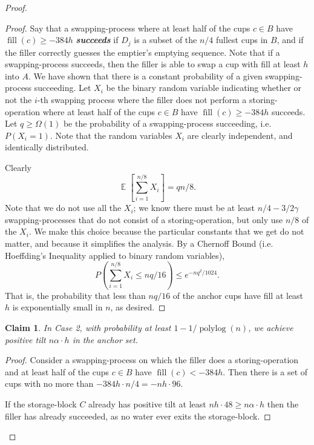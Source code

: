 \documentclass[twocolumn]{article}[10pt]
\newcommand{\defn}[1]{{\textit{\textbf{\boldmath #1}}}\xspace}
\DeclareMathOperator{\E}{\mathbb{E}}
\DeclareMathOperator{\polylog}{\text{polylog}}
\DeclareMathOperator{\fil}{\text{fill}}
\newtheorem{clm}{Claim}
\begin{document}
\begin{proof}
\begin{proof}
  Say that a swapping-process where at least half of the cups $c\in B$ have
  $\fil(c) \ge -384h$ \defn{succeeds} if $D_j$ is a subset of the $n/4$ fullest
  cups in $B$, and if the filler correctly guesses the emptier's emptying
  sequence. Note that if a swapping-process succeeds, then the filler is able
  to swap a cup with fill at least $h$ into $A$. We have shown that there is a
  constant probability of a given swapping-process succeeding. Let $X_i$ be the
  binary random variable indicating whether or not the $i$-th swapping process
  where the filler does not perform a storing-operation where at least half of
  the cups $c\in B$ have $\fil(c) \ge -384h$ succeeds. Let $q \ge \Omega(1)$ be
  the probability of a swapping-process succeeding, i.e. $P(X_i=1)$. Note that
  the random variables $X_i$ are clearly independent, and identically
  distributed.

  Clearly $$\E\left[\sum_{i=1}^{n/8} X_i\right] = qn/8.$$ Note that we do not
  use all the $X_i$; we know there must be at least $n/4 - 3/2 \gamma$
  swapping-processes that do not consist of a storing-operation, but only use
  $n/8$ of the $X_i$. We make this choice because the particular constants that
  we get do not matter, and because it simplifies the analysis.
  By a Chernoff Bound (i.e. Hoeffding's Inequality applied to binary random variables),
  $$P\left(\sum_{i=1}^{n/8} X_i\le nq/16\right) \le e^{-nq^2/1024}.$$ That is, the
  probability that less than $nq/16$ of the anchor cups have fill at least $h$ is
  exponentially small in $n$, as desired.

\end{proof}

\begin{clm}
  \label{clm:xtreme}
  In Case 2, with probability at least $1- 1/\polylog(n)$, we achieve positive
  tilt $n \alpha \cdot h$ in the anchor set.
\end{clm}

\begin{proof}
  Consider a swapping-process on which the filler does a storing-operation and
  at least half of the cups $c \in B$ have $\fil(c) < -384h$. Then there is a
  set of cups with no more than $-384h \cdot n/4 = -nh\cdot 96$.

  If the storage-block $C$ already has positive tilt at least $nh\cdot 48 \ge
  n\alpha \cdot h$ then the filler has already succeeded, as no water ever
  exits the storage-block.


\end{proof}
\end{proof}
\end{document}
